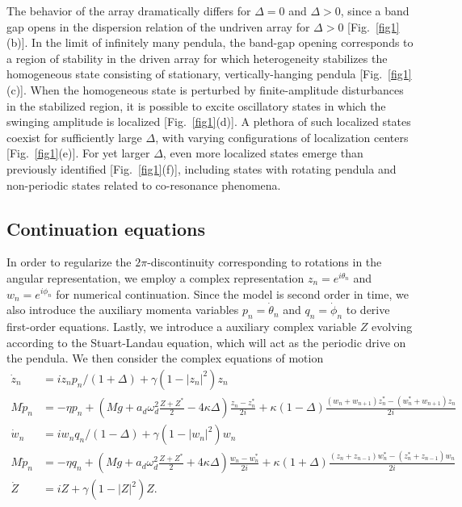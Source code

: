 \documentclass[aps,pre,amsmath,amssymb,floatfix,onecolumn,notitlepage,10pt]{revtex4-1}
\begin{document}
The behavior of the array dramatically differs for $\Delta=0$ and $\Delta>0$, since a band gap opens in the dispersion relation of the undriven array for $\Delta>0$ [Fig.~\ref{fig1}(b)]. In the limit of infinitely many pendula, the band-gap opening corresponds to a region of stability in the driven array for which heterogeneity stabilizes the homogeneous state consisting of stationary, vertically-hanging pendula [Fig.~\ref{fig1}(c)]. When the homogeneous state is perturbed by finite-amplitude disturbances in the stabilized region, it is possible to excite oscillatory states in which the swinging amplitude is localized [Fig.~\ref{fig1}(d)]. A plethora of such localized states coexist for sufficiently large $\Delta$, with varying configurations of localization centers [Fig.~\ref{fig1}(e)]. For yet larger $\Delta$, even more localized states emerge than previously identified [Fig.~\ref{fig1}(f)], including states with rotating pendula and non-periodic states related to co-resonance phenomena.

\subsection{Continuation equations}
In order to regularize the $2\pi$-discontinuity corresponding to rotations in the angular representation, we employ a complex representation $z_n=e^{i\theta_n}$ and $w_n=e^{i\phi_n}$ for numerical continuation. Since the model is second order in time, we also introduce the auxiliary momenta variables $p_n = \dot{\theta}_n$ and $q_n=\dot{\phi}_n$ to derive first-order equations.  Lastly, we introduce a auxiliary complex variable $Z$ evolving according to the Stuart-Landau equation, which will act as the periodic drive on the pendula. We then consider the complex equations of motion
\begin{align}
\dot{z}_n&=iz_np_n/(1+\Delta)+\gamma(1-|z_n|^2)z_n \label{cpendula1} \\
M\dot{p}_n&=-\eta p_n+(Mg+a_d\omega_d^2\frac{Z+Z^*}{2}-4\kappa\Delta)\frac{z_n-z_n^*}{2i} +\kappa(1-\Delta)\frac{(w_n+w_{n+1})z_n^*-(w_n^*+w_{n+1})z_n}{2i} \label{cpendula2} \\
\dot{w}_n&=iw_nq_n/(1-\Delta)+\gamma(1-|w_n|^2)w_n \label{cpendula3} \\
M\dot{p}_n&=-\eta q_n+(Mg+a_d\omega_d^2\frac{Z+Z^*}{2}+4\kappa\Delta)\frac{w_n-w_n^*}{2i} +\kappa(1+\Delta)\frac{(z_n+z_{n-1})w_n^*-(z_n^*+z_{n-1})w_n}{2i} \label{cpendula4}\\
\dot{Z}&=iZ+\gamma(1-|Z|^2)Z. \label{cpendula5}
\end{align}
\end{document}
